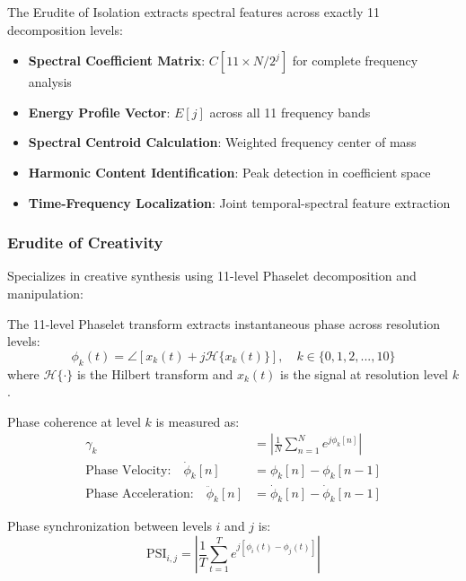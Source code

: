 The Erudite of Isolation extracts spectral features across exactly 11 decomposition levels:
\begin{itemize}
    \item \textbf{Spectral Coefficient Matrix}: $C[11 \times N/2^j]$ for complete frequency analysis
    \item \textbf{Energy Profile Vector}: $E[j]$ across all 11 frequency bands
    \item \textbf{Spectral Centroid Calculation}: Weighted frequency center of mass
    \item \textbf{Harmonic Content Identification}: Peak detection in coefficient space
    \item \textbf{Time-Frequency Localization}: Joint temporal-spectral feature extraction
\end{itemize}

\subsubsection{Erudite of Creativity}
Specializes in creative synthesis using 11-level Phaselet decomposition and manipulation:

\begin{definition}
The 11-level Phaselet transform extracts instantaneous phase across resolution levels:
\begin{equation}
\phi_k(t) = \angle[x_k(t) + j \mathcal{H}\{x_k(t)\}], \quad k \in \{0,1,2,...,10\}
\end{equation}
where $\mathcal{H}\{\cdot\}$ is the Hilbert transform and $x_k(t)$ is the signal at resolution level $k$.
\end{definition}

\begin{definition}
Phase coherence at level $k$ is measured as:
\begin{align}
\gamma_k &= \left|\frac{1}{N}\sum_{n=1}^{N} e^{j\phi_k[n]}\right| \\
\text{Phase Velocity:} \quad \dot{\phi}_k[n] &= \phi_k[n] - \phi_k[n-1] \\
\text{Phase Acceleration:} \quad \ddot{\phi}_k[n] &= \dot{\phi}_k[n] - \dot{\phi}_k[n-1]
\end{align}
\end{definition}

\begin{definition}
Phase synchronization between levels $i$ and $j$ is:
\begin{equation}
\text{PSI}_{i,j} = \left|\frac{1}{T}\sum_{t=1}^{T} e^{j[\phi_i(t) - \phi_j(t)]}\right|
\end{equation}
\end{definition}

